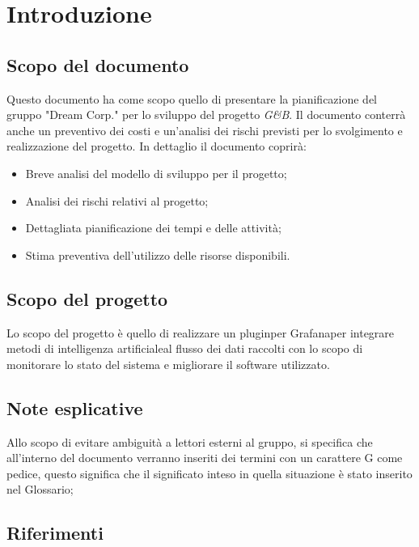 \section{Introduzione}
		\subsection{Scopo del documento}

			Questo documento ha come scopo quello di presentare la pianificazione del gruppo "Dream Corp." per lo sviluppo del progetto \textit{G\&B}.
			Il documento conterrà anche un preventivo dei costi e un'analisi dei rischi previsti per lo svolgimento e realizzazione del progetto.\newline
			In dettaglio il documento coprirà:
			\begin{itemize}
				\item Breve analisi del modello di sviluppo per il progetto; 
				\item Analisi dei rischi relativi al progetto;
				\item Dettagliata pianificazione dei tempi e delle attività;
				\item Stima preventiva dell'utilizzo delle risorse disponibili.
			\end{itemize}

		\subsection{Scopo del progetto}

			Lo scopo del progetto è quello di realizzare un plugin\pedice per Grafana\pedice per integrare metodi di intelligenza artificiale\pedice al flusso dei dati raccolti con lo scopo di monitorare lo stato del sistema e migliorare il software utilizzato.

		\subsection{Note esplicative}

			Allo scopo di evitare ambiguità a lettori esterni al gruppo, si specifica che all'interno del documento verranno inseriti dei termini con un carattere G come pedice, questo significa che il significato inteso in quella situazione è stato inserito nel Glossario;

		\newpage
		\subsection{Riferimenti}

